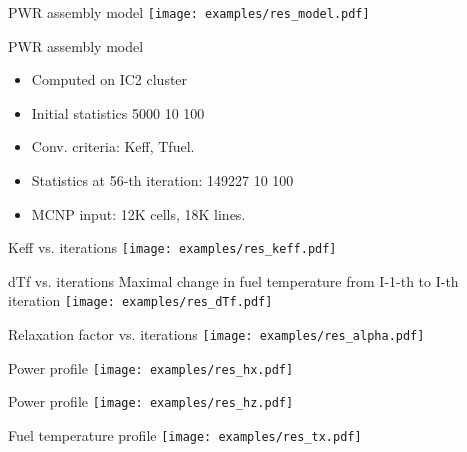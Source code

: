 \begin{frame}{PWR assembly model}
    \texttt{[image: examples/res\_model.pdf]}
\end{frame}

\begin{frame}{PWR assembly model}
    \begin{itemize}
        \item Computed on IC2 cluster
        \item Initial statistics 5000 10 100
        \item Conv. criteria: Keff, Tfuel.
        \item Statistics at 56-th iteration: 149227 10 100
        \item MCNP input: 12K cells, 18K lines.
    \end{itemize}
\end{frame}

\begin{frame}{Keff vs. iterations}
    \texttt{[image: examples/res\_keff.pdf]}
\end{frame}

\begin{frame}{dTf vs. iterations}
    Maximal change in fuel temperature from I-1-th to I-th iteration
    \texttt{[image: examples/res\_dTf.pdf]}
\end{frame}

\begin{frame}{Relaxation factor vs. iterations}
    \texttt{[image: examples/res\_alpha.pdf]}
\end{frame}


\begin{frame}{Power profile}
    \texttt{[image: examples/res\_hx.pdf]}
\end{frame}

\begin{frame}{Power profile}
    \texttt{[image: examples/res\_hz.pdf]}
\end{frame}

\begin{frame}{Fuel temperature profile}
    \texttt{[image: examples/res\_tx.pdf]}
\end{frame}

